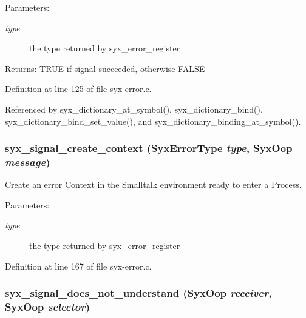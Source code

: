\begin{Desc}
\item[Parameters:]
\begin{description}
\item[{\em type}]the type returned by syx\_\-error\_\-register \end{description}
\end{Desc}
\begin{Desc}
\item[Returns:]TRUE if signal succeeded, otherwise FALSE \end{Desc}


Definition at line 125 of file syx-error.c.

Referenced by syx\_\-dictionary\_\-at\_\-symbol(), syx\_\-dictionary\_\-bind(), syx\_\-dictionary\_\-bind\_\-set\_\-value(), and syx\_\-dictionary\_\-binding\_\-at\_\-symbol().\hypertarget{syx-error_8c_94600ae5844a012288943b78c0d1fc6c}{
\subsubsection{ syx\_\-signal\_\-create\_\-context ({\bf SyxErrorType} {\em type}, \/  {\bf SyxOop} {\em message})}}
\label{syx-error_8c_94600ae5844a012288943b78c0d1fc6c}


Create an error Context in the Smalltalk environment ready to enter a Process.

\begin{Desc}
\item[Parameters:]
\begin{description}
\item[{\em type}]the type returned by syx\_\-error\_\-register \end{description}
\end{Desc}


Definition at line 167 of file syx-error.c.\hypertarget{syx-error_8c_8211271c20a9e598b2c395b60bd892a0}{
\subsubsection{ syx\_\-signal\_\-does\_\-not\_\-understand ({\bf SyxOop} {\em receiver}, \/  {\bf SyxOop} {\em selector})}}
\label{syx-error_8c_8211271c20a9e598b2c395b60bd892a0}


